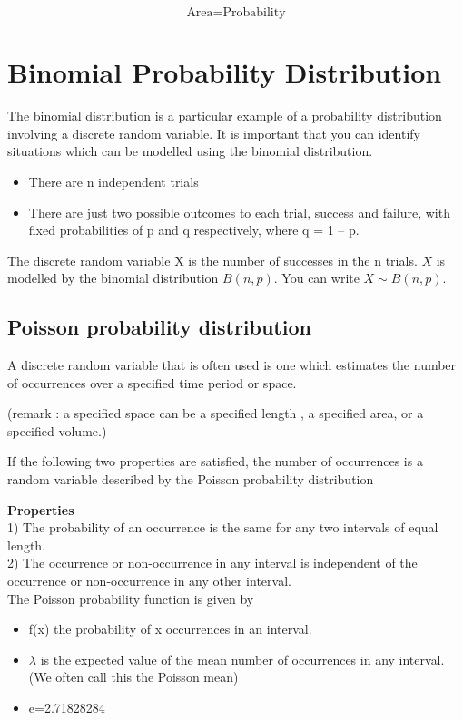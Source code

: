 \[ \mbox{Area} = \mbox{Probability} \]



\newpage
\section{Binomial Probability Distribution}
The binomial distribution is a particular example of a probability distribution involving a discrete random variable. 
It is important that you can identify situations which can be modelled using the binomial distribution. 
\begin{itemize}
\item There are n independent trials 
\item There are just two possible outcomes to each trial, success and failure, with fixed probabilities of p and q respectively, where q = 1 – p. 
\end{itemize}

The discrete random variable X is the number of successes in the n trials. 
$X$ is modelled by the binomial distribution $B(n,p)$. You can write $X \sim B(n, p)$.



\subsection{Poisson probability distribution}

A discrete random variable that is often used is one which estimates the number of occurrences  over a specified time period or space.

(remark : a specified space can be a specified length , a specified area, or a specified volume.)

If the following two properties are satisfied, the number of occurrences is a random variable described by the Poisson probability distribution

\textbf{Properties}\\
1)      The probability of an occurrence is the same for any two intervals of equal length.\\
2)      The occurrence or non-occurrence in any interval is independent of the occurrence or non-occurrence in any other interval.\\

The Poisson probability function is given by

 
 
\begin{itemize} 
\item	f(x) the probability of x occurrences in an interval. 
\item	$\lambda$ is the expected value of the mean number of occurrences in any interval. (We often call this the Poisson mean)
\item	e=2.71828284
\end{itemize} 

